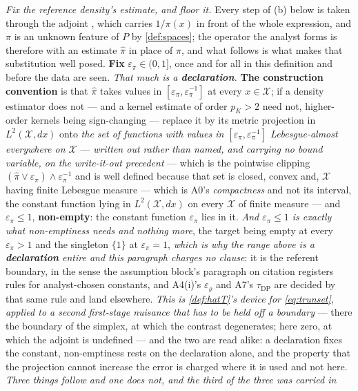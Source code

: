 \begin{definition}
\emph{Fix the reference density's estimate, and floor it.} Every step of \textup{(b)} below is taken
through the adjoint , which carries $1/\pi(x)$ in front of the whole expression, and
$\pi$ is an unknown feature of $P$ by \cref{def:spaces}; the operator the analyst forms is therefore
 with an estimate $\hat\pi$ in place of $\pi$, and what follows is what makes that
substitution well posed. \textbf{Fix} $\varepsilon_\pi\in(0,1]$, once and for all in this definition and
before the data are seen. \emph{That much is a \textbf{declaration}.} \textbf{The construction
convention} is that $\hat\pi$ takes values in $[\varepsilon_\pi,\varepsilon_\pi^{-1}]$ at every
$x\in\mathcal X$; if a density estimator does not --- and a kernel estimate of order $p_K>2$ need not,
higher-order kernels being sign-changing --- replace it by its metric projection in
$L^{2}(\mathcal X,dx)$ onto \emph{the set of functions with values in
$[\varepsilon_\pi,\varepsilon_\pi^{-1}]$ Lebesgue-almost everywhere on $\mathcal X$} --- \emph{written
out rather than named, and carrying no bound variable, on the write-it-out precedent} --- which is the
pointwise clipping $(\hat\pi\vee\varepsilon_\pi)\wedge\varepsilon_\pi^{-1}$ and is well
defined because that set is closed, convex and, $\mathcal X$ having finite Lebesgue measure --- which is
A0's \emph{compactness} and not its interval, the constant function lying in $L^{2}(\mathcal X,dx)$ on
every $\mathcal X$ of finite measure --- and $\varepsilon_\pi\le1$, \textbf{non-empty}: the constant
function $\varepsilon_\pi$ lies in it. \emph{And $\varepsilon_\pi\le1$ is exactly what non-emptiness
needs and nothing more}, the target being empty at every $\varepsilon_\pi>1$ and the singleton $\{1\}$
at $\varepsilon_\pi=1$, \emph{which is why the range above is a \textbf{declaration} entire and this
paragraph charges no clause}: it is the referent boundary, in the sense the assumption block's
paragraph on citation registers rules for analyst-chosen constants, and A4(i)'s
$\varepsilon_\varrho$ and A7's $\tau_{\mathrm{DP}}$ are decided by that same rule and land elsewhere.
\emph{This is \cref{def:hatT}'s device for \eqref{eq:trunset}, applied to a second first-stage nuisance
that has to be held off a boundary} --- there the boundary of the simplex, at which the contrast
degenerates; here zero, at which the adjoint is undefined --- and the two are read alike: a declaration
fixes the constant, non-emptiness rests on the
declaration alone, and the property that the projection cannot increase the error is charged where it is
used and not here. \emph{Three things follow and one does not, and the third of the three was carried in
}
\end{definition}
